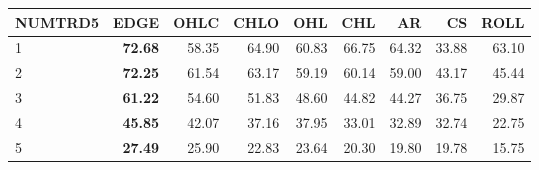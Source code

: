 \begin{table}[ht]
\centering
\begin{tabular}{lrrrrrrrr}
  \hline
NUMTRD5 & EDGE & OHLC & CHLO & OHL & CHL & AR & CS & ROLL \\ 
  \hline
1 & \textbf{72.68} & 58.35 & 64.90 & 60.83 & 66.75 & 64.32 & 33.88 & 63.10 \\ 
  2 & \textbf{72.25} & 61.54 & 63.17 & 59.19 & 60.14 & 59.00 & 43.17 & 45.44 \\ 
  3 & \textbf{61.22} & 54.60 & 51.83 & 48.60 & 44.82 & 44.27 & 36.75 & 29.87 \\ 
  4 & \textbf{45.85} & 42.07 & 37.16 & 37.95 & 33.01 & 32.89 & 32.74 & 22.75 \\ 
  5 & \textbf{27.49} & 25.90 & 22.83 & 23.64 & 20.30 & 19.80 & 19.78 & 15.75 \\ 
   \hline
\end{tabular}
\end{table}
